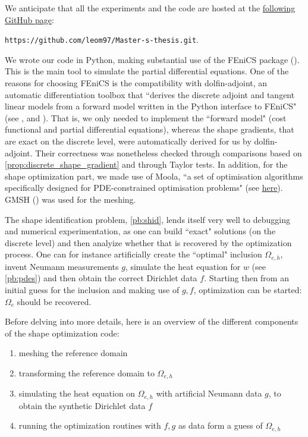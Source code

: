 \documentclass[english,a4paper,9pt,oneside]{scrbook}	%
\theoremstyle{break}
\theoremstyle{remark}
\begin{document}
We anticipate that all the experiments and the code are hosted at the \href{https://github.com/leom97/Master-s-thesis.git}{following GitHub page}: 
\begin{center}
\texttt{https://github.com/leom97/Master-s-thesis.git}.
\end{center}
We wrote our code in Python, making substantial use of the FEniCS package (\cite{fenics}). This is the main tool to simulate the partial differential equations. One of the reasons for choosing FEniCS is the compatibility with dolfin-adjoint, an automatic differentiation toolbox that ``derives the discrete adjoint and tangent linear models from a forward model written in the Python interface to FEniCS" (see \cite{dolfin-adjoint_1}, \cite{dolfin-adjoint_2} and \cite{dolfin-adjoint_3}). That is, we only needed to implement the ``forward model" (cost functional and partial differential equations), whereas the shape gradients, that are exact on the discrete level, were automatically derived for us by dolfin-adjoint. Their correctness was nonetheless checked through comparisons based on \cref{prop:discrete_shape_gradient} and through Taylor tests. In addition, for the shape optimization part, we made use of Moola, ``a set of optimisation algorithms specifically designed for PDE-constrained optimisation problems" (see \href{https://github.com/funsim/moola}{here}). GMSH (\cite{gmsh}) was used for the meshing.

The shape identification problem, \cref{pb:shid}, lends itself very well to debugging and numerical experimentation, as one can build ``exact" solutions (on the discrete level) and then analyize whether that is recovered by the optimization process. One can for instance artificially create the ``optimal" inclusion $\Omega_{e,h}$, invent Neumann measurements $g$, simulate the heat equation for $w$ (see \cref{pb:pdes}) and then obtain the correct Dirichlet data $f$. Starting then from an initial guess for the inclusion and making use of $g,f$, optimization can be started: $\Omega_e$ should be recovered.

Before delving into more details, here is an overview of the different components of the shape optimization code:
\begin{enumerate}
	\item meshing the reference domain
	\item transforming the reference domain to $\Omega_{e,h}$
	\item simulating the heat equation on $\Omega_{e,h}$ with artificial Neumann data $g$, to obtain the synthetic Dirichlet data $f$
	\item running the optimization routines with $f,g$ as data form a guess of $\Omega_{e,h}$
\end{enumerate}
\end{document}
